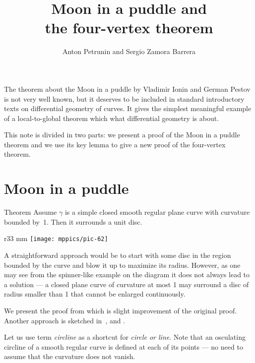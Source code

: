 \documentclass{article}
\begin{document}
\title{Moon in a puddle and\\ the four-vertex theorem}
\author{Anton Petrunin and Sergio Zamora Barrera}
\date{}
\maketitle

The theorem about the Moon in a puddle by Vladimir Ionin and German Pestov \cite{pestov-ionin} is not very well known, but it deserves to be included in standard introductory texts on differential geometry of curves.
It gives the simplest meaningful example of a local-to-global theorem which what differential geometry is about.

This note is divided in two parts: we present a proof of the Moon in a puddle theorem and we use its key lemma to give a new proof of the four-vertex theorem. 


\section*{Moon in a puddle}

\begin{thm}{Theorem}\label{thm:moon-orginal}
Assume $\gamma$ is a simple closed smooth regular plane curve with curvature bounded by~1.
Then it surrounds a unit disc.
\end{thm}


{

\begin{wrapfigure}{r}{33 mm}
\vskip-6mm
\centering
\texttt{[image: mppics/pic-62]}
\vskip0mm
\end{wrapfigure}

A straightforward approach would be to start with some disc in the region bounded by the curve and blow it up to maximize its radius.
However, as one may see from the spinner-like example on the diagram it does not always lead to a solution --- a closed plane curve of curvature at most 1 may surround a disc of radius smaller than 1 that cannot be enlarged continuously.

}

We present the proof from \cite{petrunin-zamora} which is slight improvement of the original proof.
Another approach is sketched in~\cite{petrunin-2020,panov-petrunin}, and \cite[Problem 1.7.19]{toponogov}.

Let us use term \emph{circline} as a shortcut for \emph{circle or line}.
Note that an osculating circline of a smooth regular curve is defined at each of its points --- no need to assume that the curvature does not vanish.
\end{document}
